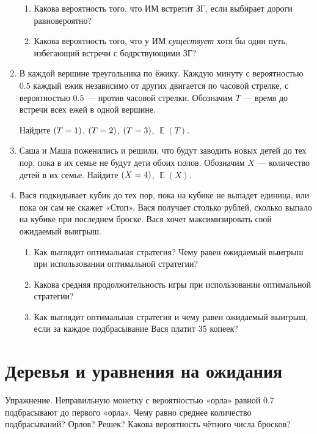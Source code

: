 \documentclass[12pt]{article}
\DeclareMathOperator{\E}{\mathbb{E}}
\let\P\relax
\DeclareMathOperator{\P}{\mathbb{P}}
\theoremstyle{definition}
\begin{document}
\begin{enumerate}
\begin{enumerate}
  \item Какова вероятность того, что ИМ встретит ЗГ, если выбирает дороги равновероятно?
  \item Какова вероятность того, что у ИМ \textit{существует} хотя бы один путь, избегающий встречи с бодрствующими ЗГ?
\end{enumerate}

\item В каждой вершине треугольника по ёжику. Каждую минуту с вероятностью $0.5$ каждый ежик
независимо от других двигается по часовой стрелке, с вероятностью
$0.5$ — против часовой стрелки.
Обозначим $T$ — время до встречи всех ежей в одной вершине.

Найдите $\P(T=1)$, $\P(T=2)$, $\P(T=3)$, $\E(T)$.

\item Саша и Маша поженились и решили, что будут заводить новых детей до тех пор,
пока в их семье не будут дети обоих полов. Обозначим $X$ — количество детей в их семье.
Найдите $\P(X=4)$, $\E(X)$.

\item Вася подкидывает кубик до тех пор, пока на кубике не выпадет единица, или пока он сам не скажет «Стоп». 
Вася получает столько рублей, сколько выпало на кубике при последнем броске. 
Вася хочет максимизировать свой ожидаемый выигрыш.
\begin{enumerate}
\item Как выглядит оптимальная стратегия? Чему равен ожидаемый выигрыш при использовании оптимальной стратегии?
\item Какова средняя продолжительность игры при использовании оптимальной стратегии?
\item Как выглядит оптимальная стратегия и чему равен ожидаемый выигрыш, если за каждое
подбрасывание Вася платит 35 копеек?
\end{enumerate}

\end{enumerate}

\section{Деревья и уравнения на ожидания}

Упражнение. Неправильную монетку с вероятностью «орла» равной $0.7$ подбрасывают до первого «орла».
Чему равно среднее количество подбрасываний?  Орлов? Решек? Какова вероятность чётного числа бросков? 
\end{document}
